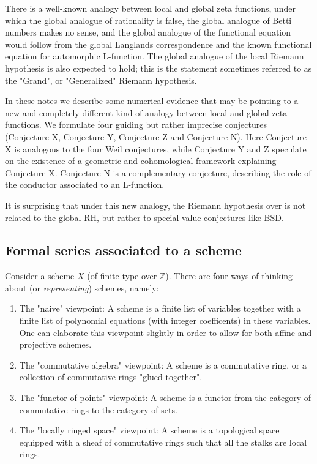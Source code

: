 \documentclass[paper=a4, fontsize=11pt]{scrartcl} %
\numberwithin{equation}{section} %
\numberwithin{figure}{section} %
\numberwithin{table}{section} %
\begin{document}
There is a well-known analogy between local and global zeta functions, under which the global analogue of rationality is false, the global analogue of Betti numbers makes no sense, and the global analogue of the functional equation would follow from the global Langlands correspondence and the known functional equation for automorphic L-function. The global analogue of the local Riemann hypothesis is also expected to hold; this is the statement sometimes referred to as the "Grand", or "Generalized" Riemann hypothesis.

In these notes we describe some numerical evidence that may be pointing to a new and completely different kind of analogy between local and global zeta functions. We formulate four guiding but rather imprecise conjectures (Conjecture X, Conjecture Y, Conjecture Z and Conjecture N). Here Conjecture X is analogous to the four Weil conjectures, while Conjecture Y and Z speculate on the existence of a geometric and cohomological framework explaining Conjecture X. Conjecture N is a complementary conjecture, describing the role of the conductor associated to an L-function.

It is surprising that under this new analogy, the Riemann hypothesis over  is not related to the global RH, but rather to special value conjectures like BSD.

\subsection{Formal series associated to a scheme}

Consider a scheme $X$ (of finite type over $\mathbb{Z}$). There are four ways of thinking about (or \emph{representing}) schemes, namely:
\begin{enumerate}
\item The "naive" viewpoint: A scheme is a finite list of variables together with a finite list of polynomial equations (with integer coefficents) in these variables. One can elaborate this viewpoint slightly in order to allow for both affine and projective schemes.
\item The "commutative algebra" viewpoint: A scheme is a commutative ring, or a collection of commutative rings "glued together".
\item The "functor of points" viewpoint: A scheme is a functor from the category of commutative rings to the category of sets.
\item The "locally ringed space" viewpoint: A scheme is a topological space equipped with a sheaf of commutative rings such that all the stalks are local rings.
\end{enumerate}
\end{document}
